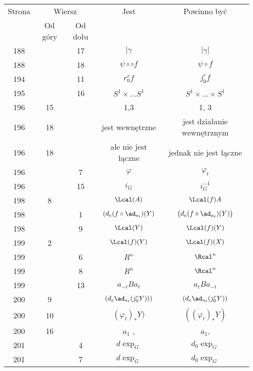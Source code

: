 \documentclass[a4paper,11pt]{article}
\numberwithin{equation}{section}
\begin{document}
\begin{center}
  \begin{tabular}{|c|c|c|c|c|}
    \hline
    Strona & \multicolumn{2}{c|}{Wiersz} & Jest
                              & Powinno być \\ \cline{2-3}
    & Od góry & Od dołu & & \\
    \hline
    188 & & 17 & $| \gamma$ & $| \gamma |$ \\
    188 & & 18 & $\psi \circ \circ f$ & $\psi \circ f$ \\
    194 & & 11 & $r^{ r }_{ 0 } f$ & $j^{ r }_{ 0 } f$ \\
    195 & & 16 & $S^{ 1 } \times \ldots S^{ 1 }$ & $S^{ 1 } \times \ldots \times S^{ 1 }$ \\
    196 & 15 & & 1,3 & 1, 3 \\
    196 & 18 & & jest wewnętrzne & jest działanie wewnętrznym \\
    196 & 18 & & ale nie jest łączne & jednak nie jest łączne \\
    196 & & \hphantom{0}7 & $\varphi$ & $\varphi_{ t }$ \\
    196 & & 15 & $i_{ G }$ & $i_{ G }^{ -1 }$ \\
    198 & \hphantom{0}8 & & $\Lcal( A )$ & $\Lcal( f )A$ \\
    198 & & \hphantom{0}1 & $( d_{ e }( f \circ \ad_{ a_{ t } } )( Y )$
           & $\big( d_{ e }( f \circ \ad_{ a_{ t } } )( Y ) \big)$ \\
    198 & & \hphantom{0}9 & $\Lcal( Y )$ & $\Lcal( f )( Y )$ \\
    199 & \hphantom{0}2 & & $\Lcal( f )( Y )$ & $\Lcal( f )( X )$ \\
    199 & & \hphantom{0}6 & $R^{ n }$ & $\Rcal^{ n }$ \\
    199 & & \hphantom{0}8 & $R^{ n }$ & $\Rcal^{ n }$ \\
    199 & & 13 & $a_{ -t } B a_{ t }$ & $a_{ t } B a_{ -t }$ \\
    200 & \hphantom{0}9 & & $( d_{ e }\ad_{ a_{ t } }( j^{ r }_{ 0 } Y ) ) )$
           & $( d_{ e }\ad_{ a_{ t } }( j^{ r }_{ 0 } Y ) )$ \\
    200 & 10 & & $( \varphi_{ t } )_{ * } Y )$
           & $( ( \varphi_{ t } )_{ * } Y )$ \\
    200 & 16 & & $a_{ 1 }$ , & $a_{ 1 }$, \\
    201 & & \hphantom{0}4 & $d \exp_{ G }$ & $d_{ 0 } \exp_{ G }$ \\
    201 & & \hphantom{0}7 & $d \exp_{ G }$ & $d_{ 0 } \exp_{ G }$ \\

\end{tabular}
\end{center}
\end{document}

